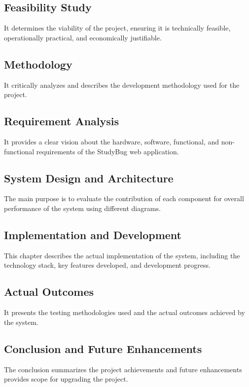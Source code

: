             \subsection{Feasibility Study}
                It determines the viability of the project, ensuring it is technically feasible, operationally practical, and economically justifiable.
            \subsection{Methodology}
                It critically analyzes and describes the development methodology used for the project.
            \subsection{Requirement Analysis}
                It provides a clear vision about the hardware, software, functional, and non-functional requirements of the StudyBug web application.
            \subsection{System Design and Architecture}
                The main purpose is to evaluate the contribution of each component for overall performance of the system using different diagrams.
            \subsection{Implementation and Development}
                This chapter describes the actual implementation of the system, including the technology stack, key features developed, and development progress.
            \subsection{Actual Outcomes}
                It presents the testing methodologies used and the actual outcomes achieved by the system.
            \subsection{Conclusion and Future Enhancements}
                The conclusion summarizes the project achievements and future enhancements provides scope for upgrading the project.
